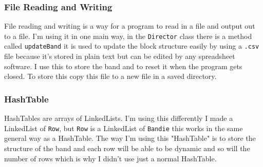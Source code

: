 \documentclass{article}
\begin{document}
\subsubsection{File Reading and Writing}
File reading and writing is a way for a program to read in a file and output out to a file. I'm using it in one main way, in the \verb|Director| class there is a method called \verb|updateBand| it is used to update the block structure easily by using a \verb|.csv| file because it's stored in plain text but can be edited by any spreadsheet software. I use this to store the band and to reset it when the program gets closed. To store this copy this file to a new file in a saved directory\cite{moveFile}.
\subsubsection{HashTable}
HashTables\cite{hashTable} are arrays of LinkedLists\cite{linkedList}. I'm using this differently I made a LinkedList\cite{linkedList} of \verb|Row|, but \verb|Row| is a LinkedList\cite{linkedList} of \verb|Bandie| this works in the same general way as a HashTable\cite{hashTable}. The way I'm using this "HashTable" is to store the structure of the band and each row will be able to be dynamic and so will the number of rows which is why I didn't use just a normal HashTable\cite{hashTable}.
\end{document}
